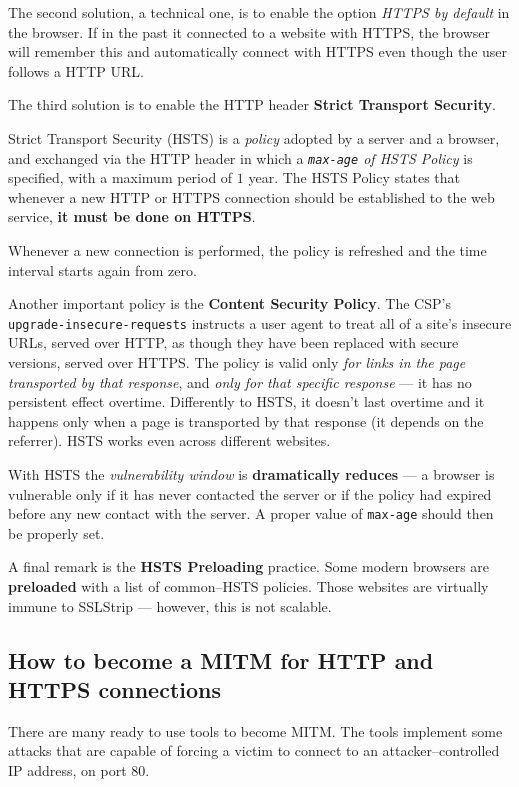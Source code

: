 \documentclass[10pt]{\classname}
\begin{document}
The second solution, a technical one, is to enable the option \emph{HTTPS by
default} in the browser. If in the past it connected to a website with HTTPS,
the browser will remember this and automatically connect with HTTPS even though
the user follows a HTTP URL.

The third solution is to enable the HTTP header \textbf{Strict Transport
Security}.

Strict Transport Security (HSTS) is a \emph{policy} adopted by a server and a
browser, and exchanged via the HTTP header in which a \emph{\texttt{max-age} of
HSTS Policy} is specified, with a maximum period of $1$ year. The HSTS Policy
states that whenever a new HTTP or HTTPS connection should be established to the
web service, \textbf{it must be done on HTTPS}.

Whenever a new connection is performed, the policy is refreshed and the time
interval starts again from zero.

Another important policy is the \textbf{Content Security Policy}. The CSP's
\texttt{upgrade\--insecure\--requests} instructs a user agent to treat all of a
site's insecure URLs, served over HTTP, as though they have been replaced with
secure versions, served over HTTPS. The policy is valid only \emph{for links in
the page transported by that response}, and \emph{only for that specific
response} --- it has no persistent effect overtime. Differently to HSTS, it
doesn't last overtime and it happens only when a page is transported by that
response (it depends on the referrer). HSTS works even across different
websites.

With HSTS the \emph{vulnerability window} is \textbf{dramatically reduces} --- a
browser is vulnerable only if it has never contacted the server or if the
policy had expired before any new contact with the server. A proper value of
\texttt{max-age} should then be properly set.

A final remark is the \textbf{HSTS Preloading} practice. Some modern browsers
are \textbf{preloaded} with a list of common--HSTS policies. Those websites are
virtually immune to SSLStrip --- however, this is not scalable.

\subsection{How to become a MITM for HTTP and HTTPS connections}

There are many ready to use tools to become MITM. The tools implement some
attacks that are capable of forcing a victim to connect to an
attacker--controlled IP address, on port $80$.
\end{document}
